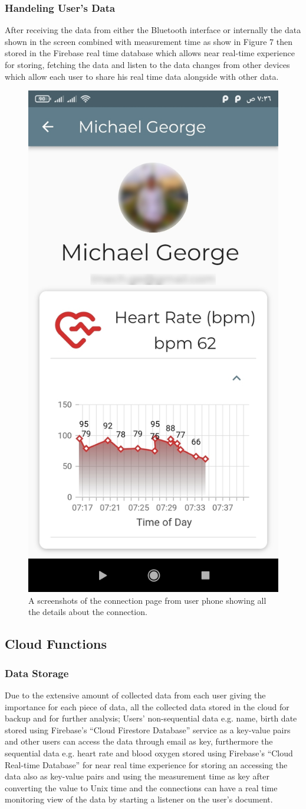 \documentclass{bmcart}
\begin{document}
\subsubsection*{Handeling User's Data}
After receiving the data from either the Bluetooth interface or internally the
data shown in the screen combined with measurement time as show in Figure 7
then stored in the Firebase real time database which allows near real-time
experience for storing, fetching the data and listen to the data changes from
other devices which allow each user to share his real time data alongside with
other data.
\begin{figure}[h!]
  \includegraphics[width=.3\linewidth]{jpg_images/connection_page.jpg}
  \caption{
      A screenshots of the connection page from user phone showing all the
      details about the connection.}
\end{figure}
\FloatBarrier

\subsection*{Cloud Functions}
\subsubsection*{Data Storage}
Due to the extensive amount of collected data from each user giving the
importance for each piece of data, all the collected data stored in the cloud
for backup and for further analysis; Users' non-sequential data e.g. name, birth
date  stored using Firebase's “Cloud Firestore Database” service as a key-value
pairs and other users can access the data through email
as key, furthermore the sequential data e.g. heart rate and blood oxygen stored
using Firebase's “Cloud Real-time Database” for near real time experience for
storing an accessing the data also as key-value pairs and using the measurement
time as key after converting the value to Unix time and
the connections can have a real time monitoring  view of the data by starting a
listener on the user's document.
\end{document}
